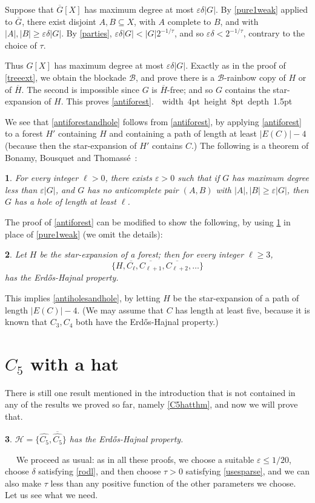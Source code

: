 \documentclass[titlepage,11pt]{article}
\newcommand\blackslug{\hbox{\hskip 1pt \vrule width 4pt height 8pt depth 1.5pt
        \hskip 1pt}}
\newcommand\bbox{\hfill \quad \blackslug \bigbreak}
\newcommand{\vare}{\varepsilon}
\newtheorem{thm}{}[section]
\newcommand{\Proof}{\noindent{\bf Proof.}\ \ }
\begin{document}
Suppose that $\overline{G}[X]$ has maximum degree at most $\vare\delta|G|$. By \ref{pure1weak} applied to $\overline{G}$, 
there exist disjoint $A,B\subseteq X$, with $A$ complete to $B$, and with 
$|A|,|B|\ge \vare\delta|G|$. By \ref{parties}, $ \vare\delta|G|<|G|2^{-1/\tau}$, and so $ \vare\delta<2^{-1/\tau}$, contrary 
to the choice of $\tau$.

Thus $G[X]$ has maximum degree at most $\vare\delta|G|$.
Exactly as in the proof of \ref{treeext}, we obtain the blockade $\mathcal{B}$, and prove 
there is a $\mathcal{B}$-rainbow copy of $H$ or of $\overline{H}$.
The second is impossible since $G$ is $\overline{H}$-free; and so $G$ contains the star-expansion of $H$.
This proves \ref{antiforest}.~\bbox
 
We see that \ref{antiforestandhole} follows from \ref{antiforest}, by applying \ref{antiforest} to a forest $H'$ containing $H$ and containing 
a path of length at least 
$|E(C)|-4$
(because then the star-expansion of $H'$ contains $C$.)
The following is a theorem of  Bonamy, Bousquet and Thomass\'e~\cite{bonamy}:
\begin{thm}\label{bonamy}
For every integer $\ell>0$, there exists $\vare>0$ such that if $G$ has maximum degree less than $\vare|G|$, and $G$
has no anticomplete pair $(A,B)$ with $|A|,|B|\ge \vare|G|$, then $G$ has a hole of length at least $\ell$.
\end{thm}
The proof of \ref{antiforest} can be modified to show the following, by using \ref{bonamy} in place of \ref{pure1weak} (we omit the details):
\begin{thm}\label{antiholesandtree}
Let $H$ be the star-expansion of a forest; then for every integer $\ell\ge 3$,
$$\{H,\overline{C_{\ell}}, \overline{C_{\ell+1}},\overline{C_{\ell+2}},\ldots\}$$ 
has the Erd\H os-Hajnal property.
\end{thm}

This implies \ref{antiholesandhole}, by letting $H$ be the star-expansion of a path of length $|E(C)|-4$. (We may assume that
$C$ has length at least five, because it is known that $C_3,C_4$ both have the Erd\H os-Hajnal property.)

\section{$C_5$ with a hat}

There is still one result mentioned in the introduction that is not contained in any of the results we proved so far, namely
\ref{C5hatthm}, and now we will prove that.
\begin{thm}\label{C5hatthm2}
$\mathcal{H}=\{\widehat{C_5},\overline{\widehat{C_5}}\}$ has the Erd\H os-Hajnal property.
\end{thm}
\Proof
We proceed as usual: as in all these proofs, we choose a suitable $\vare\le 1/20$, choose $\delta$ satisfying \ref{rodl},
and then choose $\tau>0$ satisfying \ref{usesparse}, and we can also make $\tau$ less than
any positive function of the other parameters we choose. Let us see what we need.
\end{document}
